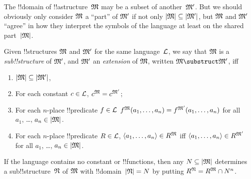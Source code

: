 \documentclass[../../include/open-logic-section]{subfiles}
\begin{document}

The !!{domain} of !!a{structure}~$\mathfrak M$ may be a subset of
another~$\mathfrak M'$.  But we should obviously only consider
$\mathfrak M$ a ``part'' of $\mathfrak M'$ if not only $\left| \mathfrak M \right|
\subseteq \left| \mathfrak M' \right|$, but $\mathfrak M$ and $\mathfrak M'$ ``agree''
in how they interpret the symbols of the language at least on the
shared part~$\left| \mathfrak M \right|$.

\begin{defn}
Given !!{structure}s $\mathfrak M$ and $\mathfrak M'$ for the same
language~$\mathcal L$, we say that $\mathfrak M$ is a \emph{sub!!{structure}}
of $\mathfrak M'$, and $\mathfrak M'$ an \emph{extension} of $\mathfrak M$,
written $\Struct M \substruct \Struct M'$, iff
\begin{enumerate}
\item $\left| \mathfrak M \right| \subseteq \left| \mathfrak M' \right|$,
\item For each constant $c \in \mathcal L$, $c^{\mathfrak M} =
    c^{\mathfrak M'}$;
\item For each $n$-place !!{predicate} $f \in \mathcal L$
  $f^{\mathfrak M}(a_1, \dots, a_n) = f^{\mathfrak M'}(a_1, \dots, a_n)$
  for all $a_1$, \dots, $a_n \in \left| \mathfrak M \right|$.
\item For each $n$-place !!{predicate} $R \in \mathcal L$, $\langle
  a_1, \dots, a_n\rangle \in R^{\mathfrak M}$ iff $\langle a_1, \dots,
  a_n\rangle \in R^{\mathfrak M'}$ for all $a_1$, \dots, $a_n \in
  \left| \mathfrak M \right|$.
\end{enumerate}
\end{defn}

\begin{rem}
If the language contains no constant or !!{function}s, then any $N
\subseteq \left| \mathfrak M \right|$ determines a sub!!{structure}~$\mathfrak N$ of
$\mathfrak M$ with !!{domain}~$\left| \mathfrak N \right| = N$ by putting $R^{\mathfrak N} =
R^{\mathfrak M} \cap N^n$.
\end{rem}

\end{document}
